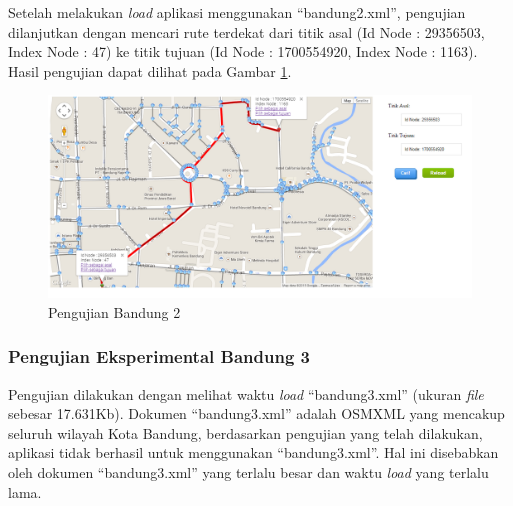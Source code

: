 Setelah melakukan \textit{load} aplikasi menggunakan ``bandung2.xml'', pengujian
dilanjutkan dengan mencari rute terdekat dari titik asal (Id Node : 29356503,
Index Node : 47) ke titik tujuan (Id Node : 1700554920, Index Node : 1163).
Hasil pengujian dapat dilihat pada Gambar \ref{fig:pu_bandung2_rute}.
\clearpage
\begin{figure}[h]
\centering
\includegraphics[scale=0.45]{Gambar/pu_bandung2_rute}
\caption[Pengujian Bandung 2]{Pengujian Bandung 2}
\label{fig:pu_bandung2_rute}
\end{figure}

\subsubsection{Pengujian Eksperimental Bandung 3}
Pengujian dilakukan dengan melihat waktu \textit{load} ``bandung3.xml'' (ukuran
\textit{file} sebesar 17.631Kb). Dokumen ``bandung3.xml'' adalah OSMXML yang
mencakup seluruh wilayah Kota Bandung, berdasarkan pengujian yang telah dilakukan, 
aplikasi tidak berhasil untuk menggunakan ``bandung3.xml''. Hal ini disebabkan oleh 
dokumen ``bandung3.xml'' yang terlalu besar dan waktu \textit{load} yang terlalu
lama.

